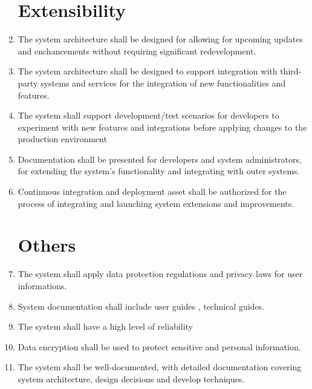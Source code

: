 \documentclass[a4paper,12pt]{report}
\begin{document}
\begin{enumerate}
	\section{Extensibility}
                 \item The system architecture shall be designed for allowing for upcoming updates and enchancements without requiring significant redevelopment.
          
                 \item The system architecture shall be designed to support integration with third-party systems and services for the integration of new 
                 functionalities and features.
          
                \item The system shall support  development/test scenarios for developers to experiment with new features and integrations before applying changes 
                 to the production environment
          
                \item Documentation shall be presented for developers and system administrators,  for extending the system's functionality and integrating with 
                 outer systems.
          
                \item Continuous integration and deployment asset shall be authorized for the process of integrating and launching system extensions and 
                 improvements.
		 
	\section{Others}
                \item The system shall apply data protection regulations and privacy laws for user informations. 
	       
	        \item System documentation shall include user guides , technical guides. 
	       
	        \item The system shall have a high level of reliability
	       
	        \item Data encryption shall be used to protect sensitive and personal information.
	       
	        \item The system shall be well-documented, with detailed documentation covering system architecture, design decisions and develop techniques.



	\end{enumerate}
\end{document}
